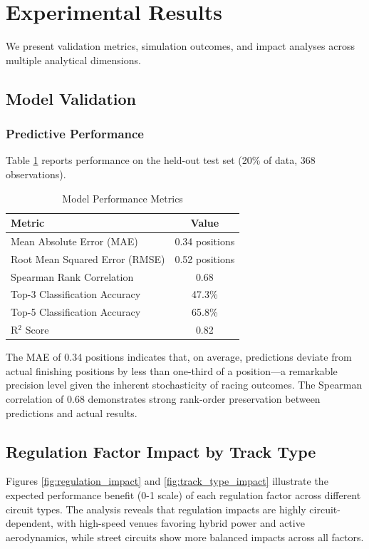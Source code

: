 \documentclass[conference]{IEEEtran}
\begin{document}
\section{Experimental Results}

We present validation metrics, simulation outcomes, and impact analyses across multiple analytical dimensions.

\subsection{Model Validation}

\subsubsection{Predictive Performance}

Table \ref{tab:model_metrics} reports performance on the held-out test set (20\% of data, 368 observations).

\begin{table}[h]
\centering
\caption{Model Performance Metrics}
\begin{tabular}{lc}
\toprule
\textbf{Metric} & \textbf{Value} \\
\midrule
Mean Absolute Error (MAE) & 0.34 positions \\
Root Mean Squared Error (RMSE) & 0.52 positions \\
Spearman Rank Correlation & 0.68 \\
Top-3 Classification Accuracy & 47.3\% \\
Top-5 Classification Accuracy & 65.8\% \\
R$^2$ Score & 0.82 \\
\bottomrule
\end{tabular}
\label{tab:model_metrics}
\end{table}

The MAE of 0.34 positions indicates that, on average, predictions deviate from actual finishing positions by less than one-third of a position—a remarkable precision level given the inherent stochasticity of racing outcomes. The Spearman correlation of 0.68 demonstrates strong rank-order preservation between predictions and actual results.

\subsection{Regulation Factor Impact by Track Type}

Figures \ref{fig:regulation_impact} and \ref{fig:track_type_impact} illustrate the expected performance benefit (0-1 scale) of each regulation factor across different circuit types. The analysis reveals that regulation impacts are highly circuit-dependent, with high-speed venues favoring hybrid power and active aerodynamics, while street circuits show more balanced impacts across all factors.
\end{document}
